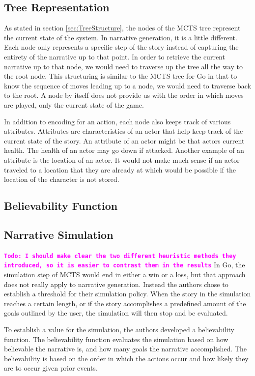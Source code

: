 \documentclass{sig-alternate}
\newcommand{\comment}[1]{{\bf \tt  {#1}}}
\newcommand{\todo}[1]{\textcolor{magenta}{\comment{Todo: {#1}}}}
\begin{document}
\subsection{Tree Representation}
As stated in section \ref{sec:TreeStructure}, the nodes of the MCTS tree represent the current state of the system. In narrative generation, it is a little different. Each node only represents a specific step of the story instead of capturing the entirety of the narrative up to that point. In order to retrieve the current narrative up to that node, we would need to traverse up the tree all the way to the root node. This structuring is similar to the MCTS tree for Go in that to know the sequence of moves leading up to a node, we would need to traverse back to the root. A node by itself does not provide us with the order in which moves are played, only the current state of the game.

In addition to encoding for an action, each node also keeps track of various attributes. Attributes are characteristics of an actor that help keep track of the current state of the story. An attribute of an actor might be that actors current health. The health of an actor may go down if attacked. Another example of an attribute is the location of an actor. It would not make much sense if an actor traveled to a location that they are already at which would be possible if the location of the character is not stored.

\subsection{Believability Function}

\subsection{Narrative Simulation}
\todo{I should make clear the two different heuristic methods they introduced, so it is easier to contrast them in the results}
In Go, the simulation step of MCTS would end in either a win or a loss, but that approach does not really apply to narrative generation. Instead the authors chose to establish a threshold for their simulation policy. When the story in the simulation reaches a certain length, or if the story accomplishes a predefined amount of the goals outlined by the user, the simulation will then stop and be evaluated.

To establish a value for the simulation, the authors developed a believability function. The believability function evaluates the simulation based on how believable the narrative is, and how many goals the narrative accomplished. The believability is based on the order in which the actions occur and how likely they are to occur given prior events.
\end{document}
